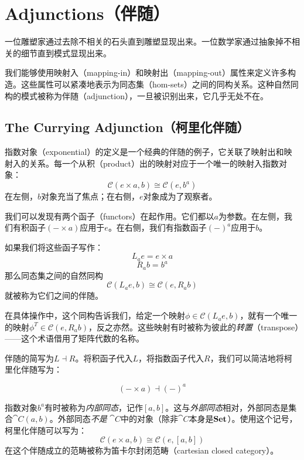 \documentclass[DaoFP]{subfiles}
\begin{document}
    \setcounter{chapter}{9}

    \chapter{Adjunctions（伴随）}

    一位雕塑家通过去除不相关的石头直到雕塑显现出来。一位数学家通过抽象掉不相关的细节直到模式显现出来。

    我们能够使用映射入（mapping-in）和映射出（mapping-out）属性来定义许多构造。这些属性可以紧凑地表示为同态集（hom-sets）之间的同构关系。这种自然同构的模式被称为伴随（adjunction），一旦被识别出来，它几乎无处不在。

    \section{The Currying Adjunction（柯里化伴随）}

    指数对象（exponential）的定义是一个经典的伴随的例子，它关联了映射出和映射入的关系。每一个从积（product）出的映射对应于一个唯一的映射入指数对象：
    \[  \mathcal{C}(e \times a, b ) \cong  \mathcal{C} (e, b^a)  \]
    在左侧，$b$对象充当了焦点；在右侧，$e$对象成为了观察者。

    我们可以发现有两个函子（functors）在起作用。它们都以$a$为参数。在左侧，我们有积函子$(- \times a)$应用于$e$。在右侧，我们有指数函子$(-)^a$应用于$b$。

    如果我们将这些函子写作：
    \[ L_a e = e \times a \]
    \[ R_a b = b^a \]
    那么同态集之间的自然同构
    \[ \mathcal{C}(L_a e, b) \cong \mathcal{C}(e, R_a b) \]
    就被称为它们之间的伴随。

    在具体操作中，这个同构告诉我们，给定一个映射$\phi \in \mathcal{C}(L_a e, b)$，就有一个唯一的映射$\phi^T \in \mathcal{C}(e, R_a b)$，反之亦然。这些映射有时被称为彼此的\emph{转置}（transpose）——这个术语借用了矩阵代数的名称。

    伴随的简写为$L \dashv R$。将积函子代入$L$，将指数函子代入$R$，我们可以简洁地将柯里化伴随写为：

    \[ (- \times a) \dashv (-)^a \]

    指数对象$b^a$有时被称为\emph{内部同态}，记作$[a, b]$。这与\emph{外部同态}相对，外部同态是集合$\cat C (a, b)$。外部同态\emph{不是} $\cat C$中的对象（除非$\cat C$本身是$\mathbf{Set}$）。使用这个记号，柯里化伴随可以写为：
    \[  \mathcal{C}(e \times a, b) \cong  \mathcal{C} (e, [a, b])  \]
    在这个伴随成立的范畴被称为笛卡尔封闭范畴（cartesian closed category）。
\end{document}
